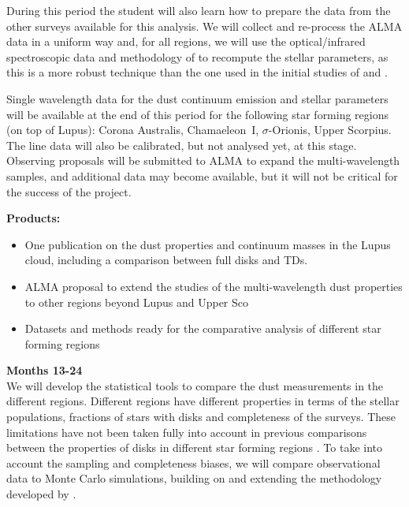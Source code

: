 \documentclass[10pt,fleqn,twoside]{article}
\begin{document}
During this period the student will also learn how to prepare the data from the other surveys available for this analysis. 
We will collect and re-process the ALMA data in a uniform way and, for all regions, we will use the optical/infrared spectroscopic data and methodology of \citet{2016ApJ...831..125P} to recompute the stellar parameters, as this is a more robust 
technique than the one used in the initial studies of \citet{2016ApJ...828...46A} and \citet{2016ApJ...827..142B}.

Single wavelength data for the dust continuum emission and stellar parameters will be available at the end of this period for the following star forming regions (on top of Lupus): Corona Australis, Chamaeleon~I, $\sigma$-Orionis, Upper Scorpius. The line data will also be calibrated, but not analysed yet, at this stage. Observing proposals will be submitted to ALMA to expand the multi-wavelength samples, and additional data may become available, but it will not be critical for the success of the project.

\smallskip
{\bf Products:} 
\begin{itemize}
\item One publication on the dust properties and continuum masses in the Lupus cloud, including a comparison between full disks and TDs.
\item ALMA proposal to extend the studies of the multi-wavelength dust properties to other regions beyond Lupus and Upper Sco
\item Datasets and methods ready for the comparative analysis of different star forming regions
\end{itemize}

{\Tcol\bf Months 13-24}\\

We will develop the statistical tools to compare the dust measurements in the different regions.
Different regions have different properties in terms of the stellar populations, fractions of stars with disks and completeness of the surveys. These limitations have not been taken fully into account in previous 
comparisons between the properties of disks in different star forming regions \citep[e.g.\ ][]{2016ApJ...828...46A,2016ApJ...831..125P}. To take into account the sampling and completeness biases, we will compare observational data to Monte Carlo simulations, building on and extending the methodology developed by \citet{2013ApJ...771..129A}.  
\end{document}
